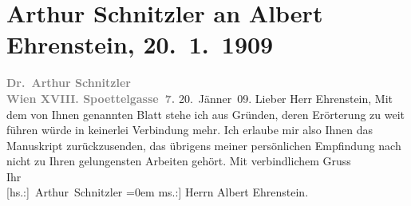 

         
         \renewcommand{\erwaehntePersonen}{Personen: Albert Ehrenstein}
         \renewcommand{\erwaehnteInstitutionen}{Institutionen: Österreichische Rundschau}
         \renewcommand{\erwaehnteOrte}{Orte: Edmund-Weiß-Gasse, Wien}
         \renewcommand{\erwaehnteWerke}{Werke: Tai-Gin}
               \section[Arthur Schnitzler an Albert Ehrenstein, 20. 1. 1909]{ Arthur Schnitzler an Albert Ehrenstein, 20. 1. 1909}\nopagebreak{}\rehead{ }\begin{ledgroupsized}[t]{13cm}\normalsize\beginnumbering \toendnotes[C]{\smallbreak\pagebreak[2]} 
\toendnotes[C]{\smallbreak}\pstart
           \noindent{}{\pb}\textcolor{gray}{\textbf{Dr. Arthur Schnitzler}}{\\}\textcolor{gray}{\textbf{Wien XVIII. Spoettelgasse 7.}}\pend
           \pstart
           \raggedleft{}20. Jänner 09.\pend
           \pstart{}Lieber Herr Ehrenstein,\pend\pstart
           Mit dem von Ihnen genannten Blatt stehe ich aus Gründen, deren Erörterung zu weit führen würde in
                    keinerlei Verbindung mehr. Ich erlaube mir also Ihnen das Manuskript zurückzusenden, das übrigens
                    meiner persönlichen Empfindung nach nicht zu Ihren gelungensten Arbeiten
                    gehört.\pend
           \pstart
           Mit verbindlichem Gruss{\\[\baselineskip]} Ihr{\\[\baselineskip]}\spacefill\mbox{{[}hs.:{]} Arthur Schnitzler}\pend
           \leftskip=0em{}\pstart
           \noindent{}{[}ms.:{]} Herrn Albert Ehrenstein.\pend
           
         
         \endnumbering{}\end{ledgroupsized}  \newcommand{\dateiname}{L01825}\newcommand{\titel}{Arthur Schnitzler an Albert Ehrenstein, 20. 1. 1909}\newcommand{\editorInnen}{Martin Anton Müller und Gerd-Hermann Susen}
      